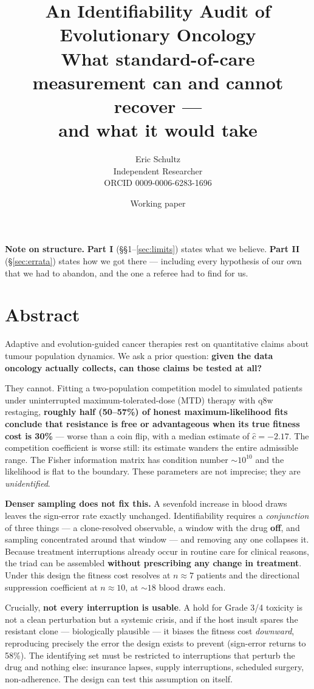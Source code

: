 \documentclass[11pt,a4paper]{article}
\title{\vspace{-1.5em}\textbf{An Identifiability Audit of Evolutionary Oncology}\\[0.35em]
\large What standard-of-care measurement can and cannot recover ---\\and what it would take}
\author{Eric Schultz\\[0.2em]
\small Independent Researcher\\
\small ORCID 0009-0006-6283-1696}
\date{\small Working paper}
\newcommand{\chat}{\hat{c}}
\begin{document}
\maketitle
\thispagestyle{fancy}

\begin{tcolorbox}[keybox]
\small
\textbf{Note on structure.} \textbf{Part I} (\S\S1--\ref{sec:limits}) states what we
believe. \textbf{Part II} (\S\ref{sec:errata}) states how we got there --- including
every hypothesis of our own that we had to abandon, and the one a referee had to find
for us.
\end{tcolorbox}

\section*{Abstract}

Adaptive and evolution-guided cancer therapies rest on quantitative claims about
tumour population dynamics. We ask a prior question: \textbf{given the data
oncology actually collects, can those claims be tested at all?}

They cannot. Fitting a two-population competition model to simulated patients
under uninterrupted maximum-tolerated-dose (MTD) therapy with q8w restaging,
\textbf{roughly half (50--57\%) of honest maximum-likelihood fits conclude that
resistance is free or advantageous when its true fitness cost is 30\%} --- worse
than a coin flip, with a median estimate of $\chat = -2.17$. The competition
coefficient is worse still: its estimate wanders the entire admissible range.
The Fisher information matrix has condition number ${\sim}10^{10}$ and the
likelihood is flat to the boundary. These parameters are not imprecise; they are
\emph{unidentified}.

\textbf{Denser sampling does not fix this.} A sevenfold increase in blood draws
leaves the sign-error rate exactly unchanged. Identifiability requires a
\emph{conjunction} of three things --- a clone-resolved observable, a window with
the drug \textbf{off}, and sampling concentrated around that window --- and
removing any one collapses it. Because treatment interruptions already occur in
routine care for clinical reasons, the triad can be assembled \textbf{without
prescribing any change in treatment}. Under this design the fitness cost resolves
at $n \approx 7$ patients and the directional suppression coefficient at
$n \approx 10$, at ${\sim}18$ blood draws each.

Crucially, \textbf{not every interruption is usable}. A hold for Grade 3/4 toxicity is
not a clean perturbation but a systemic crisis, and if the host insult spares the
resistant clone --- biologically plausible --- it biases the fitness cost
\emph{downward}, reproducing precisely the error the design exists to prevent
(sign-error returns to 58\%). The identifying set must be restricted to interruptions
that perturb the drug and nothing else: insurance lapses, supply interruptions,
scheduled surgery, non-adherence. The design can test this assumption on itself.
\end{document}
